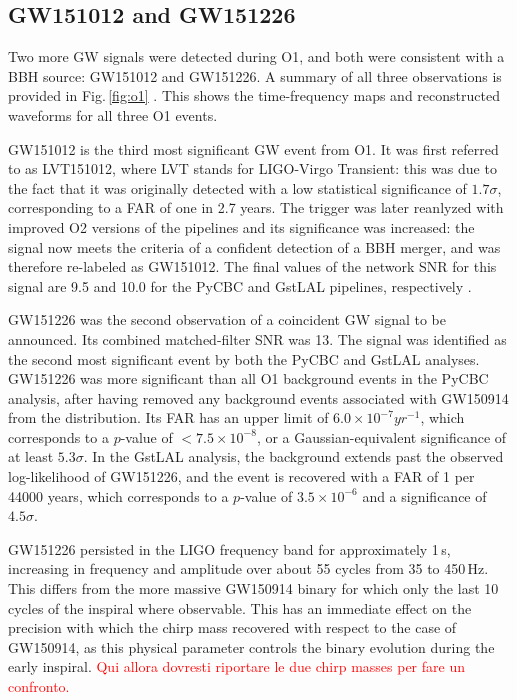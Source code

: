 \documentclass[binding=0.6cm, LaM]{sapthesis}
\newcommand{\fpg}[1]{\textcolor{red}{#1} }
\begin{document}
\subsection{GW151012 and GW151226}

Two more GW signals were detected during O1, and both were consistent with a BBH source: GW151012 and GW151226.  A summary of all three observations is provided in Fig.\,\ref{fig:o1} \cite{193}.  This shows the time-frequency maps and reconstructed waveforms for all three O1 events.

	GW151012 is the third most significant GW event from O1.  It was first referred to as LVT151012, where LVT stands for LIGO-Virgo Transient: this was due to the fact that it
	was originally detected with a low statistical significance of $1.7\sigma$, 
	corresponding to a FAR of one in 2.7 years.  The trigger was later reanlyzed with improved O2 versions of the pipelines and its significance was increased: the signal now meets the criteria of a confident detection of a BBH merger, and was therefore re-labeled as GW151012.  The final values of the network SNR for this signal are 9.5 and 10.0 for the PyCBC and GstLAL pipelines, respectively \cite{13}.

	GW151226 was the second observation of a coincident GW signal to be announced. 
	Its combined matched-filter SNR was 13. 
	The signal was identified as the second most significant event by both the PyCBC and GstLAL analyses.
	GW151226 was more significant than all O1 background events in the PyCBC analysis, 
	after having removed any background events associated with GW150914 from the distribution.
	Its FAR has an upper limit of $6.0 \times 10^{-7} yr^{-1}$, which
        corresponds to a $p$-value of $< 7.5 \times 10^{-8}$, or a Gaussian-equivalent significance of at least $5.3\sigma$. 
	In the GstLAL analysis, the background extends past the observed log-likelihood of GW151226, 
	and the event is recovered with a FAR of 1 per 44000 years, which corresponds to a $p$-value of $3.5\times 10^{-6}$ and a significance of $4.5\sigma$.

	GW151226 persisted in the LIGO frequency band for approximately 1\,s, 
	increasing in frequency and amplitude over about 55 cycles from 35 to 450\,Hz. 
	This differs from the more massive GW150914 binary for which only the last 10 cycles of the inspiral where observable.  This has an immediate effect on the precision with which the chirp mass \cite{126, 127} recovered with respect to the case of GW150914, as this physical parameter controls the binary evolution during the early inspiral.  \fpg{Qui allora dovresti riportare le due chirp masses per fare un confronto.}
\end{document}
